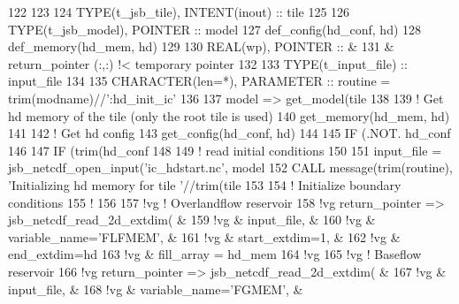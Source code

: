 \begin{DoxyCode}
122 
123 
124     \textcolor{keywordtype}{TYPE}(t\_jsb\_tile),  \textcolor{keywordtype}{INTENT(inout)} :: tile
125 
126     \textcolor{keywordtype}{TYPE}(t\_jsb\_model),       \textcolor{keywordtype}{POINTER} :: model
127     def\_config(hd\_conf, hd)
128     def\_memory(hd\_mem, hd)
129 
130     \textcolor{keywordtype}{REAL(wp)}, \textcolor{keywordtype}{POINTER} :: &
131       & return\_pointer (:,:)       !< temporary pointer
132 
133     \textcolor{keywordtype}{TYPE}(t\_input\_file) :: input\_file
134 
135     \textcolor{keywordtype}{CHARACTER(len=*)}, \textcolor{keywordtype}{PARAMETER} :: routine = trim(modname)//\textcolor{stringliteral}{':hd\_init\_ic'}
136 
137     model => get\_model(tile%
138 
139     \textcolor{comment}{! Get hd memory of the tile (only the root tile is used)}
140     get\_memory(hd\_mem, hd)
141 
142     \textcolor{comment}{! Get hd config}
143     get\_config(hd\_conf, hd)
144 
145     \textcolor{keywordflow}{IF} (.NOT. hd\_conf%
146 
147     \textcolor{keywordflow}{IF} (trim(hd\_conf%
148 
149     \textcolor{comment}{! read initial conditions}
150 
151     input\_file = jsb\_netcdf\_open\_input(\textcolor{stringliteral}{'ic\_hdstart.nc'}, model%
152     \textcolor{keyword}{CALL }message(trim(routine), \textcolor{stringliteral}{'Initializing hd memory for tile '}//trim(tile%
153 
154     \textcolor{comment}{! Initialize boundary conditions}
155     \textcolor{comment}{!}
156 
157 \textcolor{comment}{!vg     ! Overlandflow reservoir}
158 \textcolor{comment}{!vg     return\_pointer => jsb\_netcdf\_read\_2d\_extdim(  &}
159 \textcolor{comment}{!vg       & input\_file,                               &}
160 \textcolor{comment}{!vg       & variable\_name='FLFMEM',                   &}
161 \textcolor{comment}{!vg       & start\_extdim=1,                           &}
162 \textcolor{comment}{!vg       & end\_extdim=hd%
163 \textcolor{comment}{!vg       & fill\_array = hd\_mem%
164 \textcolor{comment}{!vg }
165 \textcolor{comment}{!vg     ! Baseflow reservoir}
166 \textcolor{comment}{!vg     return\_pointer => jsb\_netcdf\_read\_2d\_extdim(  &}
167 \textcolor{comment}{!vg       & input\_file,                               &}
168 \textcolor{comment}{!vg       & variable\_name='FGMEM',                    &}
}}
\end{DoxyCode}
